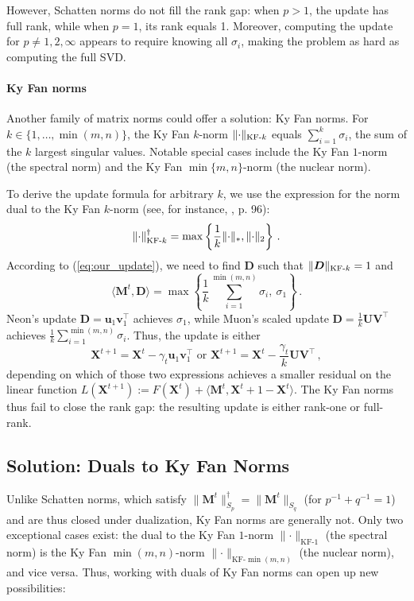 \documentclass[smallextended,referee,envcountsect]{svjour3}
\def\vu{{\bm{u}}}
\def\vv{{\bm{v}}}
\def\mD{{\bm{D}}}
\def\mM{{\bm{M}}}
\def\mU{{\bm{U}}}
\def\mV{{\bm{V}}}
\def\mX{{\bm{X}}}
\newcommand{\norm}[1]{\lVert #1\rVert}
\DeclarePairedDelimiter{\norms}{\|}{\|_{\mathrm{2}}}
\DeclarePairedDelimiter{\normn}{\|}{\|_{*}}
\DeclarePairedDelimiter{\normkfk}{\|}{\|_{\text{KF-}k}}
\def\<#1,#2>{\langle #1,#2\rangle}
\begin{document}
 However, Schatten norms do not fill the rank gap: when $p > 1$, the update has full rank, while when $p=1$, its rank equals 1. Moreover, computing the update for $p \neq 1, 2, \infty$ appears to require knowing all $\sigma_i$, making the problem as hard as computing the full SVD.
 
 \paragraph{Ky Fan norms}
 Another family of matrix norms could offer a solution: Ky Fan norms. For $k \in \{1, \dots, \min(m, n)\}$, the Ky Fan $k$-norm $\normkfk{\cdot}$ equals $\sum_{i=1}^{k}\sigma_i$, the sum of the $k$ largest singular values. Notable special cases include the Ky Fan $1$-norm (the spectral norm) and the Ky Fan $\min\{m, n\}$-norm (the nuclear norm).
 
 To derive the update formula for arbitrary $k$, we use the expression for the norm dual to the Ky Fan $k$-norm (see, for instance, \citep{bhatia2013matrix}, p. 96):
 \[
     \normkfk{\cdot}^\dagger = \max\left\{\frac{1}{k} \normn{\cdot}, \norms{\cdot}\right\}\,.
 \]
 According to (\ref{eq:our_update}), we need to find $\mD$ such that $\normkfk{\mD} = 1$ and
 \[
 \<\mM^t, \mD> = \max\left\{\frac{1}{k}\sum_{i=1}^{\min(m,n)}\sigma_i,\ \sigma_1\right\}\,.
 \]
 Neon's update $\mD = \vu_1 \vv_1^\top$ achieves $\sigma_1$, while Muon's scaled update $\mD = \frac{1}{k}\mU\mV^\top$ achieves $\frac{1}{k}\sum_{i=1}^{\min(m,n)}\sigma_i$. Thus, the update is either
 \[
 \mX^{t+1} = \mX^{t} - \gamma_t \vu_1 \vv_1^\top\text{ or }\mX^{t+1} = \mX^{t} - \frac{\gamma_t}{k}\mU \mV^\top\,,
 \]
 depending on which of those two expressions achieves a smaller residual on the linear function $L(\mX^{t+1}) := F(\mX^t) + \<\mM^t, \mX^{t+1} - \mX^t>$. The Ky Fan norms thus fail to close the rank gap: the resulting update is either rank-one or full-rank.
 
 \subsection{Solution: Duals to Ky Fan Norms}
 
 Unlike Schatten norms, which satisfy $\norm{\mM^t}_{S_p}^\dagger = \norm{\mM^t}_{S_q}$ (for $p^{-1} + q^{-1} = 1$) and are thus closed under dualization, Ky Fan norms are generally not. Only two exceptional cases exist: the dual to the Ky Fan $1$-norm $\norm{\cdot}_{\text{KF-}1}$ (the spectral norm) is the Ky Fan $\min(m,n)$-norm $\norm{\cdot}_{\text{KF-}\min(m,n)}$ (the nuclear norm), and vice versa. Thus, working with duals of Ky Fan norms can open up new possibilities:
 
\end{document}
